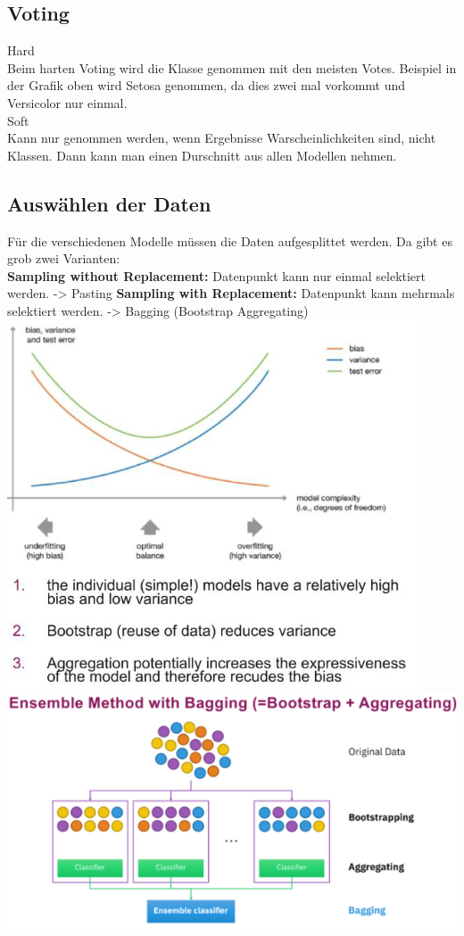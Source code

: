 \subsection{Voting}
\textcolor{myblue}{Hard}\\
Beim harten Voting wird die Klasse genommen mit den meisten Votes. Beispiel in der Grafik oben wird Setosa genommen, da
dies zwei mal vorkommt und Versicolor nur einmal.\\
\textcolor{myblue}{Soft}\\
Kann nur genommen werden, wenn Ergebnisse Warscheinlichkeiten sind, nicht Klassen. Dann kann man einen Durschnitt aus
allen Modellen nehmen.
\subsection{Auswählen der Daten}
Für die verschiedenen Modelle müssen die Daten aufgesplittet werden. Da gibt es grob zwei Varianten:\\
\textbf{Sampling without Replacement:} Datenpunkt kann nur einmal selektiert werden. -> Pasting
\textbf{Sampling with Replacement:} Datenpunkt kann mehrmals selektiert werden. -> Bagging (Bootstrap Aggregating)
\includegraphics[width=\linewidth]{img/choose_data.png}
\includegraphics[width=\linewidth]{img/ensemble_method_bagging.png}
